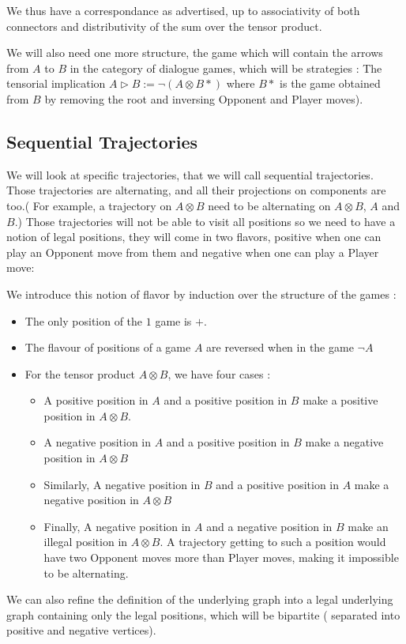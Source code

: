 \documentclass[a4paper,UKenglish]{lipics}
\begin{document}
We thus have a correspondance as advertised, up to associativity of both connectors and distributivity of the sum over the tensor product.

We will also need one more structure, the game which will contain the arrows from $A$ to $B$ in the category of dialogue games, which will be strategies : The tensorial implication $A \triangleright B := \neg (A \otimes  B*)$ where $B*$ is the game obtained from $B$ by removing the root and inversing Opponent and Player moves).

\subsection{Sequential Trajectories}

We will look at specific trajectories, that we will call sequential trajectories. Those trajectories are alternating, and all their projections on components are too.( For example, a trajectory on $A \otimes B$ need to be alternating on $A \otimes B$, $A$ and $B$.) Those trajectories will not be able to visit all positions so we need to have a notion of legal positions, they will come in two flavors, positive when one can play an Opponent  move from them and negative when one can play a Player move:
\begin{definition} We introduce this notion of flavor by induction over the structure of the games : 
\begin{itemize}
\item The only position of the $1$ game is $+$. 
\item The flavour of positions of a game $A$ are reversed when in the  game $\neg A$
\item  For the tensor product $ A\otimes B$, we have four cases :\\
\begin{itemize}
\item A positive position in $A$ and a positive position in $B$ make a positive position in $A \otimes B$.
\item A negative position in $A$ and a positive position in $B$ make a negative position in $A \otimes B$
\item Similarly, A negative position in $B$ and a positive position in $A$ make a negative position in $A \otimes B$
\item Finally, A negative position in $A$ and a negative position in $B$ make an illegal position in $A \otimes B$. A trajectory getting to such a position would have two Opponent moves more than Player moves, making it impossible to be alternating.\\
\end{itemize}
\end{itemize}
\end{definition}
We can also refine the definition of the underlying graph into a legal underlying graph containing only the legal positions, which will be bipartite ( separated into positive and negative vertices).
\end{document}
